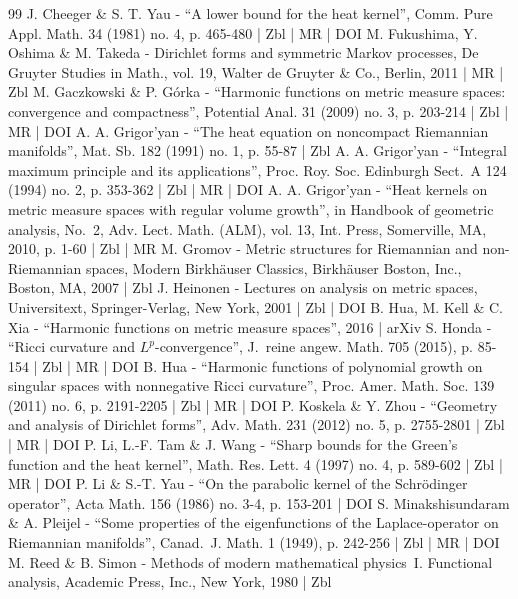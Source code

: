 \documentclass[10pt]{amsart}
\theoremstyle{plain}
\theoremstyle{definition}
\begin{document}
\begin{thebibliography}{99}
J. Cheeger \& S. T. Yau - “A lower bound for the heat kernel”, Comm. Pure Appl. Math. 34 (1981) no. 4, p. 465-480 | Zbl | MR | DOI
M. Fukushima, Y. Oshima \& M. Takeda - Dirichlet forms and symmetric Markov processes, De Gruyter Studies in Math., vol. 19, Walter de Gruyter \& Co., Berlin, 2011 | MR | Zbl
M. Gaczkowski \& P. Górka - “Harmonic functions on metric measure spaces: convergence and compactness”, Potential Anal. 31 (2009) no. 3, p. 203-214 | Zbl | MR | DOI
A. A. Grigor’yan - “The heat equation on noncompact Riemannian manifolds”, Mat. Sb. 182 (1991) no. 1, p. 55-87 | Zbl
A. A. Grigor’yan - “Integral maximum principle and its applications”, Proc. Roy. Soc. Edinburgh Sect. A 124 (1994) no. 2, p. 353-362 | Zbl | MR | DOI
A. A. Grigor’yan - “Heat kernels on metric measure spaces with regular volume growth”, in Handbook of geometric analysis, No. 2, Adv. Lect. Math. (ALM), vol. 13, Int. Press, Somerville, MA, 2010, p. 1-60 | Zbl | MR
M. Gromov - Metric structures for Riemannian and non-Riemannian spaces, Modern Birkhäuser Classics, Birkhäuser Boston, Inc., Boston, MA, 2007 | Zbl
J. Heinonen - Lectures on analysis on metric spaces, Universitext, Springer-Verlag, New York, 2001 | Zbl | DOI
B. Hua, M. Kell \& C. Xia - “Harmonic functions on metric measure spaces”, 2016 | arXiv
S. Honda - “Ricci curvature and $L^p$-convergence”, J. reine angew. Math. 705 (2015), p. 85-154 | Zbl | MR | DOI
B. Hua - “Harmonic functions of polynomial growth on singular spaces with nonnegative Ricci curvature”, Proc. Amer. Math. Soc. 139 (2011) no. 6, p. 2191-2205 | Zbl | MR | DOI
P. Koskela \& Y. Zhou - “Geometry and analysis of Dirichlet forms”, Adv. Math. 231 (2012) no. 5, p. 2755-2801 | Zbl | MR | DOI
P. Li, L.-F. Tam \& J. Wang - “Sharp bounds for the Green’s function and the heat kernel”, Math. Res. Lett. 4 (1997) no. 4, p. 589-602 | Zbl | MR | DOI
P. Li \& S.-T. Yau - “On the parabolic kernel of the Schrödinger operator”, Acta Math. 156 (1986) no. 3-4, p. 153-201 | DOI
S. Minakshisundaram \& A. Pleijel - “Some properties of the eigenfunctions of the Laplace-operator on Riemannian manifolds”, Canad. J. Math. 1 (1949), p. 242-256 | Zbl | MR | DOI
M. Reed \& B. Simon - Methods of modern mathematical physics I. Functional analysis, Academic Press, Inc., New York, 1980 | Zbl

\end{thebibliography}
\end{document}
